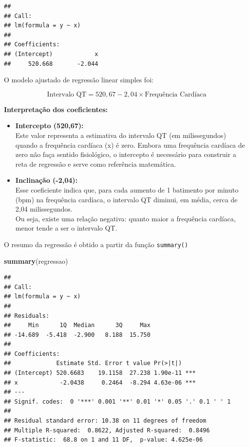\documentclass[
]{book}
\newenvironment{Shaded}{\begin{snugshade}}{\end{snugshade}}
\newcommand{\FunctionTok}[1]{\textcolor[rgb]{0.13,0.29,0.53}{\textbf{#1}}}
\newcommand{\NormalTok}[1]{#1}
\begin{document}
\begin{verbatim}
## 
## Call:
## lm(formula = y ~ x)
## 
## Coefficients:
## (Intercept)            x  
##     520.668       -2.044
\end{verbatim}

O modelo ajustado de regressão linear simples foi:

\[
\text{Intervalo QT} = 520,67 - 2,04 \times \text{Frequência Cardíaca}
\]

\textbf{Interpretação dos coeficientes:}

\begin{itemize}
\item
  \textbf{Intercepto (520,67):}\\
  Este valor representa a estimativa do intervalo QT (em milissegundos) quando a frequência cardíaca (x) é zero. Embora uma frequência cardíaca de zero não faça sentido fisiológico, o intercepto é necessário para construir a reta de regressão e serve como referência matemática.
\item
  \textbf{Inclinação (-2,04):}\\
  Esse coeficiente indica que, para cada aumento de 1 batimento por minuto (bpm) na frequência cardíaca, o intervalo QT diminui, em média, cerca de 2,04 milissegundos.\\
  Ou seja, existe uma relação negativa: quanto maior a frequência cardíaca, menor tende a ser o intervalo QT.
\end{itemize}

O resumo da regressão é obtido a partir da função \texttt{summary()}

\begin{Shaded}
\begin{Highlighting}[]
\FunctionTok{summary}\NormalTok{(regressao)}
\end{Highlighting}
\end{Shaded}

\begin{verbatim}
## 
## Call:
## lm(formula = y ~ x)
## 
## Residuals:
##     Min      1Q  Median      3Q     Max 
## -14.689  -5.418  -2.900   8.188  15.750 
## 
## Coefficients:
##             Estimate Std. Error t value Pr(>|t|)    
## (Intercept) 520.6683    19.1158  27.238 1.90e-11 ***
## x            -2.0438     0.2464  -8.294 4.63e-06 ***
## ---
## Signif. codes:  0 '***' 0.001 '**' 0.01 '*' 0.05 '.' 0.1 ' ' 1
## 
## Residual standard error: 10.38 on 11 degrees of freedom
## Multiple R-squared:  0.8622, Adjusted R-squared:  0.8496 
## F-statistic:  68.8 on 1 and 11 DF,  p-value: 4.625e-06
\end{verbatim}
\end{document}
